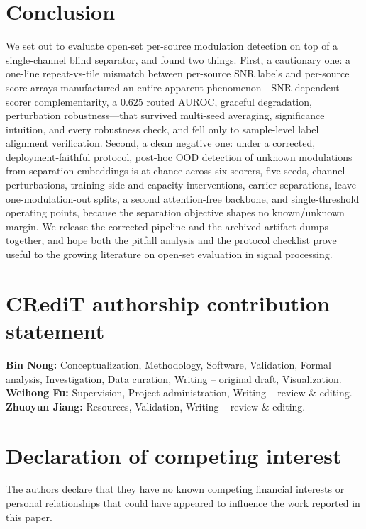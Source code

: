 \documentclass[review,12pt]{elsarticle}
\begin{document}
\section{Conclusion}
\label{sec:concl}

We set out to evaluate open-set per-source modulation detection on top
of a single-channel blind separator, and found two things. First, a
cautionary one: a one-line repeat-vs-tile mismatch between per-source
SNR labels and per-source score arrays manufactured an entire apparent
phenomenon---SNR-dependent scorer complementarity, a $0.625$ routed
AUROC, graceful degradation, perturbation robustness---that survived
multi-seed averaging, significance intuition, and every robustness
check, and fell only to sample-level label alignment verification.
Second, a clean negative one: under a corrected, deployment-faithful
protocol, post-hoc OOD detection of unknown modulations from
separation embeddings is at chance across six scorers, five seeds,
channel perturbations, training-side and capacity interventions,
carrier separations, leave-one-modulation-out splits, a second
attention-free backbone, and single-threshold operating points, because
the separation objective shapes no known/unknown margin. We release
the corrected pipeline and the archived artifact dumps together, and
hope both the pitfall analysis and the protocol checklist prove useful
to the growing literature on open-set evaluation in signal processing.

\section*{CRediT authorship contribution statement}
\textbf{Bin Nong:} Conceptualization, Methodology, Software, Validation,
Formal analysis, Investigation, Data curation, Writing -- original
draft, Visualization.
\textbf{Weihong Fu:} Supervision, Project administration, Writing --
review \& editing.
\textbf{Zhuoyun Jiang:} Resources, Validation, Writing -- review \&
editing.

\section*{Declaration of competing interest}
The authors declare that they have no known competing financial
interests or personal relationships that could have appeared to
influence the work reported in this paper.
\end{document}
